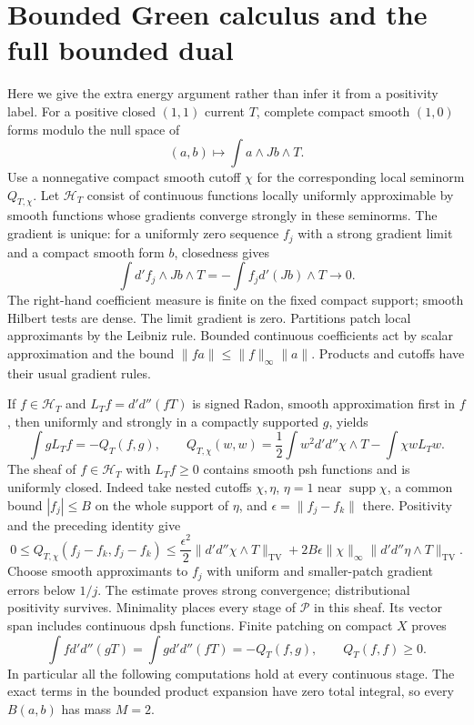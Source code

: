 \documentclass[11pt]{article}
\newcommand{\DD}{d'd''}
\newcommand{\HH}{\mathscr H}
\theoremstyle{remark}\newtheorem{remark}[theorem]{Remark}
\begin{document}
\section{Bounded Green calculus and the full bounded dual}
Here we give the extra energy argument rather than infer it from
a positivity label. For a positive closed $(1,1)$ current $T$,
complete compact smooth $(1,0)$ forms modulo the null space of
\[
 (a,b)\longmapsto\int a\wedge Jb\wedge T.
\]
Use a nonnegative compact smooth cutoff $\chi$ for the corresponding
local seminorm $Q_{T,\chi}$. Let $\HH_T$ consist of continuous
functions locally uniformly approximable by smooth functions whose
gradients converge strongly in these seminorms. The gradient is
unique: for a uniformly zero sequence $f_j$ with a strong gradient
limit and a compact smooth form $b$, closedness gives
\[
 \int d'f_j\wedge Jb\wedge T=-\int f_jd'(Jb)\wedge T\longrightarrow0.
\]
The right-hand coefficient measure is finite on the fixed compact
support; smooth Hilbert tests are dense. The limit gradient is zero.
Partitions patch local approximants by the Leibniz rule.
Bounded continuous coefficients act by scalar approximation and the
bound $\|fa\|\le\|f\|_\infty\|a\|$. Products and cutoffs have their
usual gradient rules.

If $f\in\HH_T$ and $L_Tf=\DD(fT)$ is signed Radon, smooth
approximation first in $f$, then uniformly and strongly in a
compactly supported $g$, yields
\[
 \int gL_Tf=-Q_T(f,g),\qquad
 Q_{T,\chi}(w,w)=\frac12\int w^2\DD\chi\wedge T-\int\chi wL_Tw.
\]
The sheaf of $f\in\HH_T$ with $L_Tf\ge0$ contains smooth psh
functions and is uniformly closed. Indeed take nested cutoffs
$\chi,\eta$, $\eta=1$ near $\operatorname{supp}\chi$,
a common bound $|f_j|\le B$ on the whole support of $\eta$, and
$\epsilon=\|f_j-f_k\|$ there. Positivity and the preceding identity give
\[
 0\le Q_{T,\chi}(f_j-f_k,f_j-f_k)
 \le\frac{\epsilon^2}{2}\|\DD\chi\wedge T\|_{\mathrm{TV}}
 +2B\epsilon\|\chi\|_\infty\|\DD\eta\wedge T\|_{\mathrm{TV}}.
\]
Choose smooth approximants to $f_j$ with uniform and smaller-patch
gradient errors below $1/j$. The estimate proves strong convergence;
distributional positivity survives. Minimality places every stage
of $\mathscr P$ in this sheaf. Its vector span includes continuous
dpsh functions. Finite patching on compact $X$ proves
\[
 \int f\DD(gT)=\int g\DD(fT)=-Q_T(f,g),\qquad Q_T(f,f)\ge0.
\]
In particular all the following computations hold at every
continuous stage. The exact terms in the bounded product expansion
have zero total integral, so every $B(a,b)$ has mass $M=2$.
\end{document}
